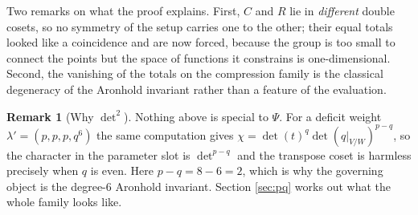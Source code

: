 \documentclass[11pt,reqno]{amsart}
\theoremstyle{plain}
\theoremstyle{definition}
\newtheorem{remark}[theorem]{Remark}
\begin{document}
Two remarks on what the proof explains.  First, $C$ and $R$ lie in
\emph{different} double cosets, so no symmetry of the setup carries one to the
other; their equal totals looked like a coincidence and are now forced, because
the group is too small to connect the points but the space of functions it
constrains is one-dimensional.  Second, the vanishing of the totals on the
compression family is the classical degeneracy of the Aronhold invariant rather
than a feature of the evaluation.

\begin{remark}[Why $\det^{2}$]\label{rem:pq}
Nothing above is special to $\Psi$.  For a deficit weight
$\lambda'=(p,p,p,q^{6})$ the same computation gives
$\chi=\det(t)^{q}\det(q|_{V/W})^{p-q}$, so the character in the parameter slot
is $\det^{p-q}$ and the transpose coset is harmless precisely when $q$ is even.
Here $p-q=8-6=2$, which is why the governing object is the degree-$6$ Aronhold
invariant.  Section \ref{sec:pq} works out what the whole family looks like.
\end{remark}
\end{document}

